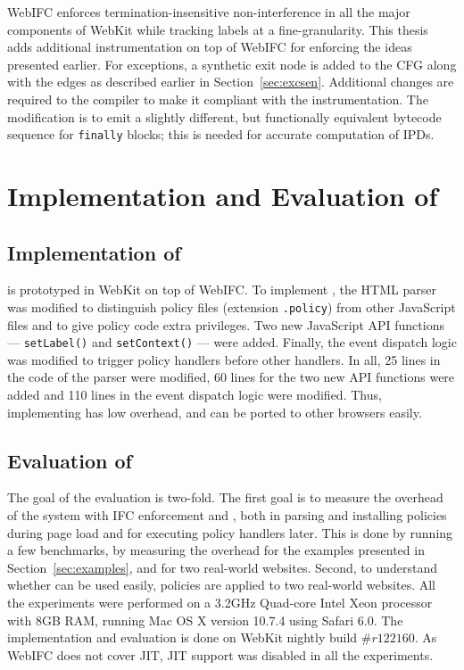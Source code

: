 WebIFC enforces termination-insensitive non-interference in all 
the major components of WebKit while tracking labels 
at a fine-granularity. This thesis adds additional instrumentation 
on top of WebIFC for enforcing the ideas presented 
earlier. For exceptions, a synthetic exit node is added to the CFG
along with the edges as described earlier in
Section~\ref{sec:excsen}. Additional changes are required to the
compiler to make it compliant with the instrumentation. The
modification is to emit a slightly different, but functionally
equivalent bytecode sequence for \texttt{finally} blocks; 
this is needed for accurate computation of IPDs. 


\section{Implementation and Evaluation of \sys}
\label{sec:implpol}
\subsection{Implementation of \sys}
{\sys} is prototyped in WebKit on top of WebIFC. To implement
{\sys}, the HTML parser was modified to distinguish policy files
(extension \texttt{.policy}) from other JavaScript files and to give
policy code extra privileges. Two new JavaScript API functions ---
\texttt{setLabel()} and \texttt{setContext()} --- were added. Finally,
the event dispatch logic was modified to trigger policy handlers
before other handlers. In all, 25 lines in the code of the parser were
modified, 60 lines for the two new API functions were added and 110
lines in the event dispatch logic were modified. Thus, implementing
{\sys} has low overhead, and can be ported to other browsers easily.

\subsection{Evaluation of \sys}
\label{sec:eval-webpol}
The goal of the evaluation is two-fold. The first goal is to measure
the overhead of the system with IFC enforcement and {\sys}, both in
parsing and installing policies during page load and for executing
policy handlers later. This is done by running a few benchmarks, by measuring the
overhead for the examples presented in Section~\ref{sec:examples}, and
for two real-world websites. Second, to 
understand whether {\sys} can be used easily, {\sys} policies are
applied to two real-world websites. All the experiments were
performed on a 3.2GHz Quad-core Intel Xeon processor with 8GB RAM,
running Mac OS X version 10.7.4 using Safari 6.0. The implementation
and evaluation is done on WebKit nightly build $\#r122160$. As 
WebIFC does not cover JIT, JIT support was
disabled in all the experiments. 

